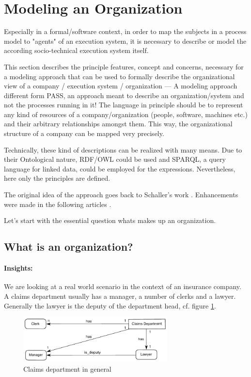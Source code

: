 \section{Modeling an Organization}

Especially in a formal/software context, in order to map the subjects in a process model to "agents" of an execution system, it is necessary to describe or model the according socio-technical execution system itself. 

This section describes the principle features, concept and concerns, necessary for a modeling approach that can be used to  formally describe the organizational view of a company / execution system / organization --- A modeling approach different form PASS, an approach meant to describe an organization/system and not the processes running in it! The language in principle should be to represent any kind of resources of a company/organization (people, software, machines etc.) and their arbitrary relationships amongst them. This way, the organizational structure of a company can be mapped very precisely.

Technically, these kind of descriptions can be realized with many means. Due to their Ontological nature, RDF/OWL could be used and SPARQL, a query language for linked data, could be employed for the expressions. Nevertheless, here only the principles are defined.

The original idea of the approach goes back to Schaller's work  \cite{Schaller98}. Enhancements were made in the following articles \cite{Lawall2014, Lawall2014a, Lawall2014b, Lawall2014d, Lawall2014c, Lawall2013, Lawall2011}.

Let's start with the essential question whats makes up an organization. 

\subsection{What is an organization?}

\paragraph{Insights:}

We are looking at a real world scenario in the context of an insurance company. A claims department usually has a manager, a number of clerks and a lawyer. Generally the lawyer is the deputy of the department head, cf. figure \ref{GeneralDep}.

\begin{figure}[htb!]
\centering
\includegraphics[width=0.7\textwidth]{Figures/Implementation/ExampleDepartmentGeneral.pdf}
\caption{Claims department in general}
\label{GeneralDep}
\end{figure}

